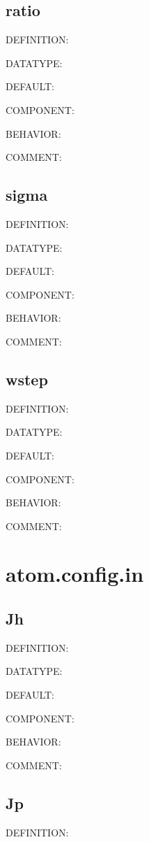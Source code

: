 \subsection{ratio}
{\color{red}DEFINITION:}

{\color{green}DATATYPE:}

{\color{blue}DEFAULT:}

{\color{brown}COMPONENT:}

{\color{purple}BEHAVIOR:}

{\color{olive}COMMENT:}

\subsection{sigma}
{\color{red}DEFINITION:}

{\color{green}DATATYPE:}

{\color{blue}DEFAULT:}

{\color{brown}COMPONENT:}

{\color{purple}BEHAVIOR:}

{\color{olive}COMMENT:}

\subsection{wstep}
{\color{red}DEFINITION:}

{\color{green}DATATYPE:}

{\color{blue}DEFAULT:}

{\color{brown}COMPONENT:}

{\color{purple}BEHAVIOR:}

{\color{olive}COMMENT:}

\section{atom.config.in}
\subsection{Jh}
{\color{red}DEFINITION:}

{\color{green}DATATYPE:}

{\color{blue}DEFAULT:}

{\color{brown}COMPONENT:}

{\color{purple}BEHAVIOR:}

{\color{olive}COMMENT:}

\subsection{Jp}
{\color{red}DEFINITION:}

